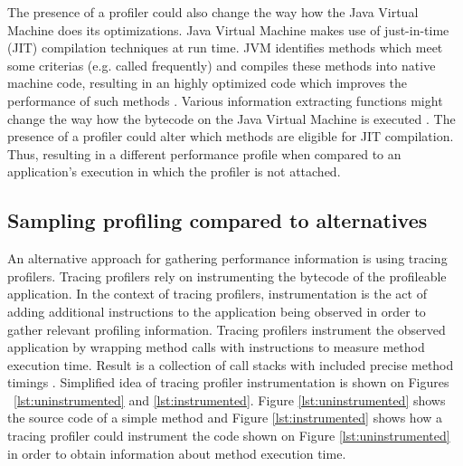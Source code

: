 \documentclass[..thesis.tex]{subfiles}
\begin{document}

The presence of a profiler could also change the way how the Java Virtual Machine does its optimizations. Java Virtual Machine makes use of just-in-time (JIT) compilation techniques at run time. JVM identifies methods which meet some criterias (e.g. called frequently) and compiles these methods into native machine code, resulting in an highly optimized code which improves the performance of such methods \cite{understanding_jit}. Various information extracting functions might change the way how the bytecode on the Java Virtual Machine is executed \cite{mytkowicz_evaluating_2010}. The presence of a profiler could alter which methods are eligible for JIT compilation. Thus, resulting in a different performance profile when compared to an application's execution in which the profiler is not attached.


\subsection{Sampling profiling compared to alternatives}

An alternative approach for gathering performance information is using tracing profilers. Tracing profilers rely on instrumenting the bytecode of the profileable application. In the context of tracing profilers, instrumentation is the act of adding additional instructions to the application being observed in order to gather relevant profiling information. Tracing profilers instrument the observed application by wrapping method calls with instructions to measure method execution time. Result is a collection of call stacks with included precise method timings \cite{whitham_jack}. Simplified idea of tracing profiler instrumentation is shown on Figures ~\ref{lst:uninstrumented} and \ref{lst:instrumented}. Figure \ref{lst:uninstrumented} shows the source code of a simple method and Figure \ref{lst:instrumented} shows how a tracing profiler could instrument the code shown on Figure \ref{lst:uninstrumented} in order to obtain information about method execution time.
\end{document}
